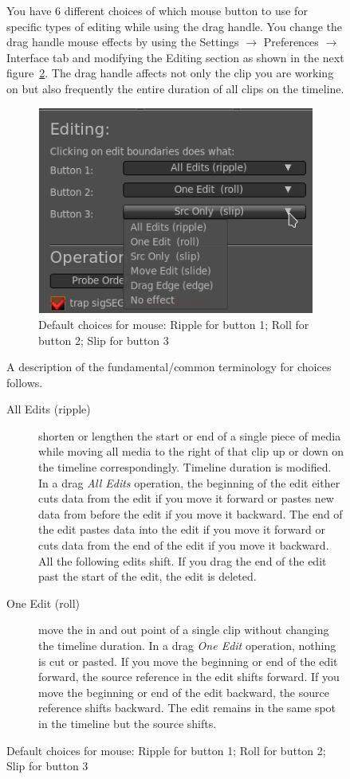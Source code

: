 \begin{figure}
You have 6 different choices of which mouse button to use for specific types of editing while using the drag handle.  You change the drag handle mouse effects by using the Settings $\rightarrow$ Preferences  $\rightarrow$ Interface tab and modifying the Editing section as shown in the next figure~\ref{fig:trim}. The drag handle affects not only the clip you are working on but also frequently the entire duration of all clips on the timeline.\\
\begin{figure}[htpb]
    \centering
    \includegraphics[width=0.6\linewidth]{images/trim.png}
    \caption{Default choices for mouse: Ripple for button 1; Roll for button 2; Slip for button 3}
    \label{fig:trim}
\end{figure}
A description of the fundamental/common terminology for choices follows.
\begin{description}
    \item[All Edits (ripple)] shorten or lengthen the start or end of a single piece of media while moving all media to the right of that clip up or down on the timeline correspondingly.  Timeline duration is modified.  In a drag \textit{All Edits} operation, the beginning of the edit either cuts data from the edit if you move it forward or pastes new data from before the edit if you move it backward. The end of the edit pastes data into the edit if you move it forward or cuts data from the end of the edit if you move it backward. All the following edits shift. If you drag the end of the edit past the start of the edit, the edit is deleted.
    \item[One Edit (roll)] move the in and out point of a single clip without changing the timeline duration. In a drag \textit{One Edit} operation, nothing is cut or pasted. If you move the beginning or end of the edit forward, the source reference in the edit shifts forward. If you move the beginning or end of the edit backward, the source reference shifts backward. The edit remains in the same spot in the timeline but the source shifts.

\end{description}
\end{figure}
